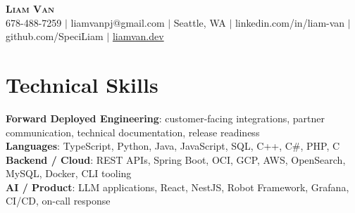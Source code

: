 \documentclass[letterpaper,11pt]{article}
\begin{document}

%
\begin{center}
    \textbf{\Huge \scshape Liam Van} \\ \vspace{1pt}
    \small 678-488-7259 $|$ \small {liamvanpj@gmail.com} $|$ Seattle, WA
 {{$|$ linkedin.com/in/liam-van} {$|$ github.com/SpeciLiam} {$|$ \href{https://liamvan.dev}{liamvan.dev}}}

\end{center}

\section{Technical Skills}
 \begin{itemize}[leftmargin=0.15in, label={}]
    \small{\item{
     \textbf{Forward Deployed Engineering}{: customer-facing integrations, partner communication, technical documentation, release readiness} \\
     \textbf{Languages}{: TypeScript, Python, Java, JavaScript, SQL, C++, C\#, PHP, C} \\
     \textbf{Backend / Cloud}{: REST APIs, Spring Boot, OCI, GCP, AWS, OpenSearch, MySQL, Docker, CLI tooling} \\
     \textbf{AI / Product}{: LLM applications, React, NestJS, Robot Framework, Grafana, CI/CD, on-call response} \\
    }}
 \end{itemize}
%

\end{document}
